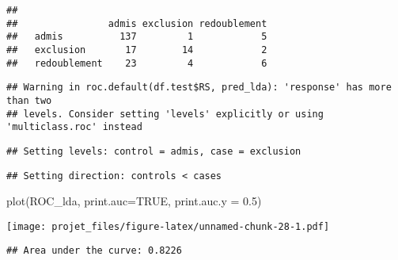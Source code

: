 \documentclass[
]{article}
\newenvironment{Shaded}{\begin{snugshade}}{\end{snugshade}}
\newcommand{\AttributeTok}[1]{\textcolor[rgb]{0.77,0.63,0.00}{#1}}
\newcommand{\CommentTok}[1]{\textcolor[rgb]{0.56,0.35,0.01}{\textit{#1}}}
\newcommand{\ConstantTok}[1]{\textcolor[rgb]{0.00,0.00,0.00}{#1}}
\newcommand{\FloatTok}[1]{\textcolor[rgb]{0.00,0.00,0.81}{#1}}
\newcommand{\FunctionTok}[1]{\textcolor[rgb]{0.00,0.00,0.00}{#1}}
\newcommand{\NormalTok}[1]{#1}
\newcommand{\OtherTok}[1]{\textcolor[rgb]{0.56,0.35,0.01}{#1}}
\newcommand{\SpecialCharTok}[1]{\textcolor[rgb]{0.00,0.00,0.00}{#1}}
\newcommand{\StringTok}[1]{\textcolor[rgb]{0.31,0.60,0.02}{#1}}
\begin{document}
\begin{verbatim}
##               
##                admis exclusion redoublement
##   admis          137         1            5
##   exclusion       17        14            2
##   redoublement    23         4            6
\end{verbatim}

\begin{Shaded}
\end{Shaded}

\begin{verbatim}
## Warning in roc.default(df.test$RS, pred_lda): 'response' has more than two
## levels. Consider setting 'levels' explicitly or using 'multiclass.roc' instead
\end{verbatim}

\begin{verbatim}
## Setting levels: control = admis, case = exclusion
\end{verbatim}

\begin{verbatim}
## Setting direction: controls < cases
\end{verbatim}

\begin{Shaded}
\begin{Highlighting}[]
\FunctionTok{plot}\NormalTok{(ROC\_lda, }\AttributeTok{print.auc=}\ConstantTok{TRUE}\NormalTok{,  }\AttributeTok{print.auc.y =} \FloatTok{0.5}\NormalTok{)}
\end{Highlighting}
\end{Shaded}

\texttt{[image: projet\_files/figure-latex/unnamed-chunk-28-1.pdf]}

\begin{Shaded}
\end{Shaded}

\begin{verbatim}
## Area under the curve: 0.8226
\end{verbatim}

\begin{Shaded}
\end{Shaded}
\end{document}

